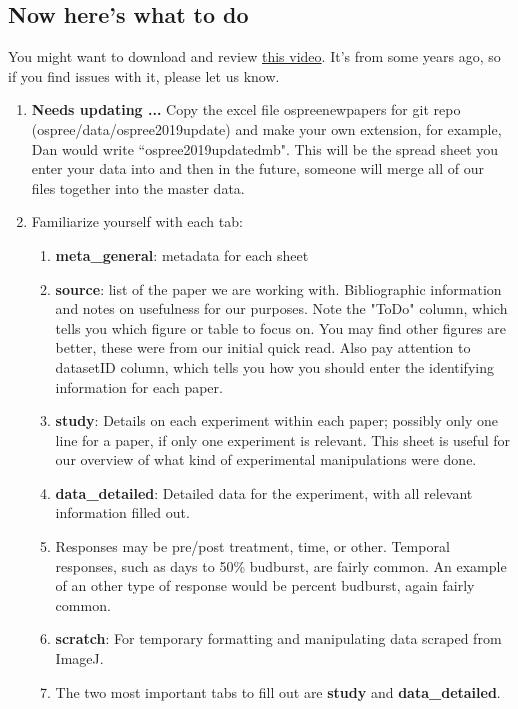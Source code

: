 \documentclass{article}[12pt]
\begin{document}
\subsection*{Now here's what to do}
You might want to download and review \href{https://github.com/lizzieinvancouver/ospree/blob/master/notes/howtoscrape/Data%20Scraping%20Tutorial.mp4}{this video}. It's from some years ago, so if you find issues with it, please let us know.
\begin{enumerate}
\item {\bf Needs updating ... } Copy the excel file ospree\textunderscore newpapers for git repo (ospree/data/ospree\textunderscore 2019update) and make your own extension, for example, Dan would write ``ospree\textunderscore 2019update\textunderscore dmb". This will be the spread sheet you enter your data into and then in the future, someone will merge all of our files together into the master data.
\item Familiarize yourself with each tab:
  \begin{enumerate}
  \item \textbf{meta\_general}: metadata for each sheet
  \item \textbf{source}: list of the paper we are working with. Bibliographic information and notes on usefulness for our purposes. Note the "ToDo" column, which tells you which figure or table to focus on. You may find other figures are better, these were from our initial quick read. Also pay attention to datasetID column, which tells you how you should enter the identifying information for each paper.
  \item \textbf{study}: Details on each experiment within each paper; possibly only one line for a paper, if only one experiment is relevant. This sheet is useful for our overview of what kind of experimental manipulations were done.
  \item \textbf{data\_detailed}: Detailed data for the experiment, with all relevant information filled out.
  \item Responses may be pre/post treatment, time, or other. Temporal responses, such as days to 50\% budburst, are fairly common. An example of an other type of response would be percent budburst, again fairly common.
  \item \textbf{scratch}: For temporary formatting and manipulating data scraped from ImageJ.
  \item The two most important tabs to fill out are \textbf{study} and \textbf{data\_detailed}. 
  \end{enumerate}

\end{enumerate}
\end{document}
